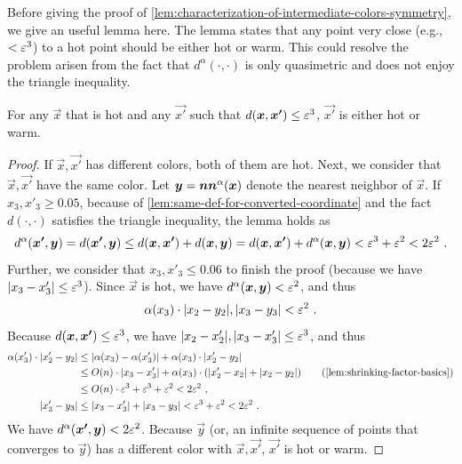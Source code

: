 Before giving the proof of \cref{lem:characterization-of-intermediate-colors-symmetry}, we give an useful lemma here. The lemma states that any point very close (e.g., $<\varepsilon^3$) to a hot point should be either hot or warm. 
This could resolve the problem arisen from the fact that $d^{\alpha}(\cdot, \cdot)$ is only quasimetric and does not enjoy the triangle inequality. 
\begin{lemma}
\label{lem:close-to-hot-points}
    For any $\vec{x}$ that is hot and any $\vec{x'}$ such that $d(\boldsymbol{x}, \boldsymbol{x'})\leq \varepsilon^3$, $\vec{x'}$ is either hot or warm. 
\end{lemma}
\begin{proof}
    If $\vec{x}, \vec{x'}$ has different colors, both of them are hot. 
    Next, we consider that $\vec{x}, \vec{x'}$ have the same color.
    Let $\boldsymbol{y}=\operatorname*{\boldsymbol{nn}^{\alpha}}(\boldsymbol{x})$ denote the nearest neighbor of $\vec{x}$.
    If $x_3,x'_3\geq 0.05$, because of \cref{lem:same-def-for-converted-coordinate} and the fact $d(\cdot,\cdot)$ satisfies the triangle inequality, the lemma holds as 
    \begin{align*}
        d^\alpha(\boldsymbol{x'},\boldsymbol{y}) = d(\boldsymbol{x'},\boldsymbol{y}) \leq d(\boldsymbol{x}, \boldsymbol{x'}) + d(\boldsymbol{x}, \boldsymbol{y}) = d(\boldsymbol{x}, \boldsymbol{x'}) + d^{\alpha}(\boldsymbol{x}, \boldsymbol{y}) < \varepsilon^3 + \varepsilon^2 < 2\varepsilon^2~.
    \end{align*}
    Further, we consider that $x_3,x'_3\leq 0.06$ to finish the proof (because we have $|x_3-x_3'|\leq \varepsilon^3$). 
    Since $\vec{x}$ is hot, we have $d^{\alpha}(\boldsymbol{x}, \boldsymbol{y})<\varepsilon^2$, and thus
    \begin{align*}
        \alpha(x_3) \cdot |x_2-y_2|, |x_3-y_3| < \varepsilon^2~.
    \end{align*}
    Because $d(\boldsymbol{x}, \boldsymbol{x'})\leq \varepsilon^3$, we have $|x_2-x'_2|, |x_3-x'_3|\leq \varepsilon^3$, and thus 
    \begin{align*}
        \alpha(x'_3) \cdot |x'_2-y_2| & \leq |\alpha(x_3)-\alpha(x'_3)| + \alpha(x_3) \cdot |x'_2-y_2|\\
        &\leq O(n)\cdot |x_3-x'_3| + \alpha(x_3)\cdot (|x'_2-x_2| + |x_2-y_2|) \tag{\cref{lem:shrinking-factor-basics}}\\
        &\leq O(n)\cdot \eps^3 + \eps^3 + \eps^2 < 2\eps^2~,\\
        |x'_3-y_3| & \leq |x_3-x'_3| + |x_3-y_3| < \eps^3 +\eps^2 < 2\eps^2~.
    \end{align*}
    We have $d^{\alpha}(\boldsymbol{x'}, \boldsymbol{y})<2\varepsilon^2$. Because $\vec{y}$ (or, an infinite sequence of points that converges to $\vec{y}$) has a different color with $\vec{x},\vec{x'}$, $\vec{x'}$ is hot or warm.
\end{proof}

